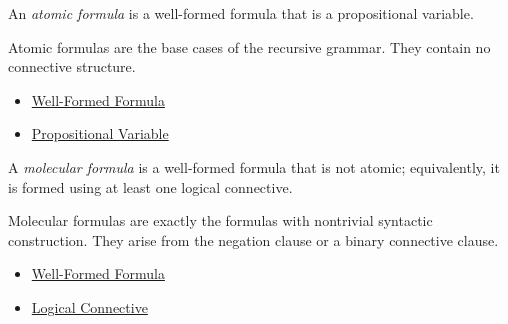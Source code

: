 \begin{tcolorbox}[colback=propbox, colframe=propborder, arc=2pt,
  left=6pt, right=6pt, top=4pt, bottom=4pt,
  title={\small\textbf{Definition (Atomic Formula)}},
  fonttitle=\small\bfseries]
\label{def:atomic-formula-propositional-logic}
An \emph{atomic formula} is a well-formed formula that is a propositional
variable.
\end{tcolorbox}

\begin{remark*}[Interpretation]
Atomic formulas are the base cases of the recursive grammar. They contain no
connective structure.
\end{remark*}

\begin{dependencies}
\begin{itemize}
  \item \hyperref[def:well-formed-formula]{Well-Formed Formula}
  \item \hyperref[def:propositional-variable]{Propositional Variable}
\end{itemize}
\end{dependencies}

\begin{tcolorbox}[colback=propbox, colframe=propborder, arc=2pt,
  left=6pt, right=6pt, top=4pt, bottom=4pt,
  title={\small\textbf{Definition (Molecular Formula)}},
  fonttitle=\small\bfseries]
\label{def:molecular-formula}
A \emph{molecular formula} is a well-formed formula that is not atomic;
equivalently, it is formed using at least one logical connective.
\end{tcolorbox}

\begin{remark*}[Interpretation]
Molecular formulas are exactly the formulas with nontrivial syntactic
construction. They arise from the negation clause or a binary connective clause.
\end{remark*}

\begin{dependencies}
\begin{itemize}
  \item \hyperref[def:well-formed-formula]{Well-Formed Formula}
  \item \hyperref[def:logical-connective]{Logical Connective}
\end{itemize}
\end{dependencies}
